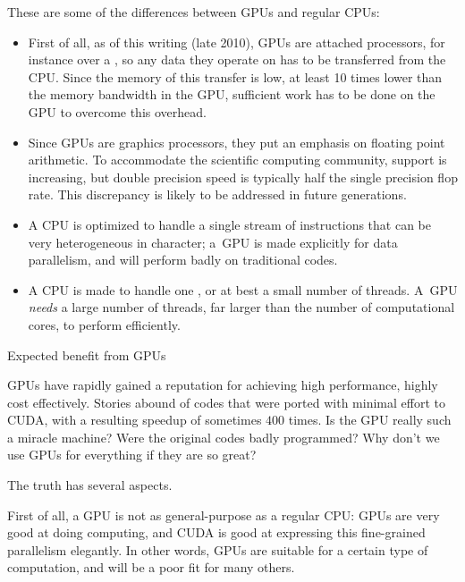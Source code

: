 These are some of the  differences between \acp{GPU} and regular CPUs:
\begin{itemize}
\item First of all, as of this writing (late 2010), \acp{GPU} are
  attached processors, for instance over a ,
  so any data they operate on has to be
  transferred from the CPU. Since the memory  of
  this transfer is low, at least 10 times lower than the memory
  bandwidth in the \ac{GPU}, sufficient work has to be done on the \ac{GPU}
  to overcome this overhead.
\item Since \acp{GPU} are graphics processors, they put an emphasis on
   floating point arithmetic. To
  accommodate the scientific computing community,  support is increasing, but double precision speed is
  typically half the single precision flop rate. This discrepancy is
  likely to be addressed in future generations.
\item A CPU is optimized to handle a single stream of instructions
  that can be very heterogeneous in character; a~\ac{GPU} is made
  explicitly for data parallelism, and will perform badly on
  traditional codes.
\item A CPU is made to handle one , or at best a
  small number of threads. A~\ac{GPU} \emph{needs} a large number of
  threads, far larger than the number of computational cores, to
  perform efficiently.
\end{itemize}

 {Expected benefit from GPUs}

\acp{GPU} have rapidly gained a reputation for achieving high
performance, highly cost effectively. Stories abound of codes that
were ported with minimal effort to CUDA, with a resulting speedup of
sometimes $400$ times. Is the GPU really such a miracle machine? Were
the original codes badly programmed? Why don't we use GPUs for
everything if they are so great?

The truth has several aspects. 

First of all, a \ac{GPU} is not as general-purpose as a regular CPU:
\acp{GPU} are very good at doing  computing,
and CUDA is good at expressing this fine-grained parallelism
elegantly. In other words, \acp{GPU} are suitable for a certain type
of computation, and will be a poor fit for many others.

